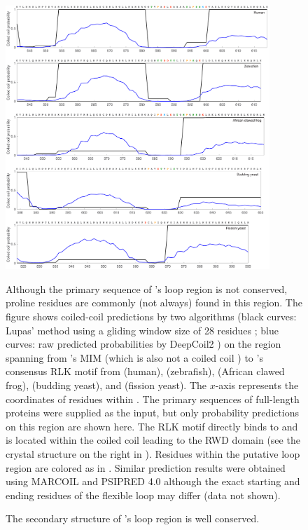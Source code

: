 \begin{figure}
    \centering
    \includegraphics[width=0.89\textwidth]{chapters/figures/MAD1_MIM-RLK_Lupas+DeepCoil2.pdf}
    \caption{The secondary structure of 's loop region is well conserved.}
    \noindent\justifying Although the primary sequence of 's loop region is not conserved, proline residues are commonly (not always) found in this region. The figure shows coiled-coil predictions by two algorithms (black curves: Lupas' method using a gliding window size of 28 residues \cite{LupasCOILS}; blue curves: raw predicted probabilities by DeepCoil2 \cite{DeepCoil}) on the region spanning from 's MIM (which is also not a coiled coil \cite{Structure1GO4}) to 's consensus RLK motif from  (human),  (zebrafish),  (African clawed frog),  (budding yeast), and  (fission yeast). The $x$-axis represents the coordinates of residues within . The primary sequences of full-length  proteins were supplied as the input, but only probability predictions on this region are shown here. The RLK motif directly binds to  \cite{Ji2017eLife, BUB1CD1-MAD1CStructure} and is located within the coiled coil leading to the RWD domain (see the crystal structure on the right in ). Residues within the putative loop region are colored as in . Similar prediction results were obtained using MARCOIL \cite{MARCOIL} and PSIPRED 4.0 \cite{PSIPREDOriginal, PSIPREDPlatform} although the exact starting and ending residues of the flexible loop may differ (data not shown).
    \label{MAD1_MIM-RLK_Lupas+DeepCoil2}
\end{figure}

